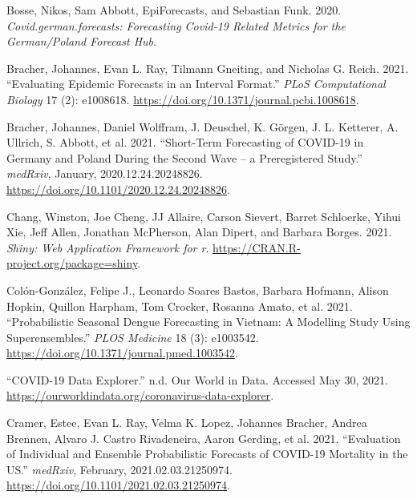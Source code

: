 \documentclass[
]{article}
\newlength{\cslhangindent}
\newlength{\cslentryspacingunit} %
\newenvironment{CSLReferences}[2] %
 {%
  \setlength{\parindent}{0pt}
  \ifodd #1
  \let\oldpar\par
  \def\par{\hangindent=\cslhangindent\oldpar}
  \fi
  \setlength{\parskip}{#2\cslentryspacingunit}
 }%
 {}
\begin{document}
\begin{CSLReferences}{1}{0}
\leavevmode{}%
Bosse, Nikos, Sam Abbott, EpiForecasts, and Sebastian Funk. 2020. \emph{Covid.german.forecasts: Forecasting Covid-19 Related Metrics for the German/Poland Forecast Hub}.

\leavevmode{}%
Bracher, Johannes, Evan L. Ray, Tilmann Gneiting, and Nicholas G. Reich. 2021. {``Evaluating Epidemic Forecasts in an Interval Format.''} \emph{PLoS Computational Biology} 17 (2): e1008618. \url{https://doi.org/10.1371/journal.pcbi.1008618}.

\leavevmode{}%
Bracher, Johannes, Daniel Wolffram, J. Deuschel, K. Görgen, J. L. Ketterer, A. Ullrich, S. Abbott, et al. 2021. {``Short-Term Forecasting of {COVID}-19 in {Germany} and {Poland} During the Second Wave -- a Preregistered Study.''} \emph{medRxiv}, January, 2020.12.24.20248826. \url{https://doi.org/10.1101/2020.12.24.20248826}.

\leavevmode{}%
Chang, Winston, Joe Cheng, JJ Allaire, Carson Sievert, Barret Schloerke, Yihui Xie, Jeff Allen, Jonathan McPherson, Alan Dipert, and Barbara Borges. 2021. \emph{Shiny: Web Application Framework for r}. \url{https://CRAN.R-project.org/package=shiny}.

\leavevmode{}%
Colón-González, Felipe J., Leonardo Soares Bastos, Barbara Hofmann, Alison Hopkin, Quillon Harpham, Tom Crocker, Rosanna Amato, et al. 2021. {``Probabilistic Seasonal Dengue Forecasting in {Vietnam}: A Modelling Study Using Superensembles.''} \emph{PLOS Medicine} 18 (3): e1003542. \url{https://doi.org/10.1371/journal.pmed.1003542}.

\leavevmode{}%
{``{COVID}-19 {Data Explorer}.''} n.d. {Our World in Data}. Accessed May 30, 2021. \url{https://ourworldindata.org/coronavirus-data-explorer}.

\leavevmode{}%
Cramer, Estee, Evan L. Ray, Velma K. Lopez, Johannes Bracher, Andrea Brennen, Alvaro J. Castro Rivadeneira, Aaron Gerding, et al. 2021. {``Evaluation of Individual and Ensemble Probabilistic Forecasts of {COVID}-19 Mortality in the {US}.''} \emph{medRxiv}, February, 2021.02.03.21250974. \url{https://doi.org/10.1101/2021.02.03.21250974}.


\end{CSLReferences}
\end{document}
